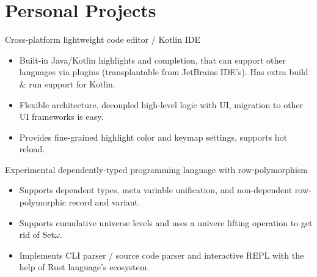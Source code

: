 \documentclass{resume}
\begin{document}
\section{Personal Projects}

Cross-platform lightweight code editor / Kotlin IDE
\begin{itemize}
  \item Built-in Java/Kotlin highlights and completion, that can support other languages
    via plugins (transplantable from JetBrains IDE's).
    Has extra build \& run support for Kotlin.
  \item Flexible architecture, decoupled high-level logic with UI, migration to other UI frameworks is easy.
  \item Provides fine-grained highlight color and keymap settings, supports hot reload.
\end{itemize}

Experimental dependently-typed programming language with row-polymorphism
\begin{itemize}
  \item Supports dependent types, meta variable unification, and non-dependent row-polymorphic record and variant.
  \item Supports cumulative universe levels and uses a univere lifting operation to get rid of Set$\omega$.
  \item Implements CLI parser / source code parser and interactive REPL with the help of Rust language's ecosystem.
\end{itemize}
\end{document}
